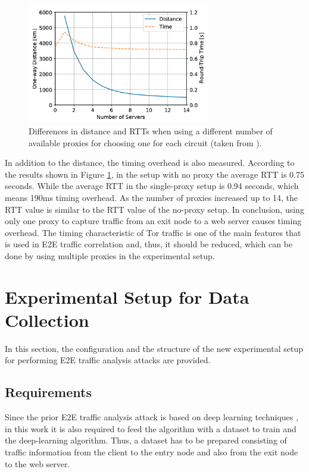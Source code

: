 \documentclass[sigconf]{acmart}
\begin{document}
\begin{figure}[h]
  \centering
  \includegraphics[width=8cm]{Figure_4.png}
 \caption{\textmd{Differences in distance and RTTs when using a different number of available proxies for choosing one for each circuit (taken from \cite{RimmerV}).}}
 \label{fig:4}
\end{figure}

In addition to the distance, the timing overhead is also measured. According to the results shown in Figure \ref{fig:4}, in the setup with no proxy the average RTT is 0.75 seconds. While the average RTT in the single-proxy setup is 0.94 seconds, which means 190ms timing overhead. As the number of proxies increased up to 14, the RTT value is similar to the RTT value of the no-proxy setup. In conclusion, using only one proxy to capture traffic from an exit node to a web server causes timing overhead. The timing characteristic of Tor traffic is one of the main features that is used in E2E traffic correlation and, thus, it should be reduced, which can be done by using multiple proxies in the experimental setup.

\vspace{3mm}


\section{Experimental Setup for Data Collection} \label{5}

In this section, the configuration and the structure of the new experimental setup for performing E2E traffic analysis attacks are provided.

\subsection{Requirements} \label{5.1}

Since the prior E2E traffic analysis attack is based on deep learning techniques \cite{nasr2018deepcorr}, in this work it is also required to feed the algorithm with a dataset to train and the deep-learning algorithm. Thus, a dataset has to be prepared consisting of traffic information from the client to the entry node and also from the exit node to the web server.
\end{document}
